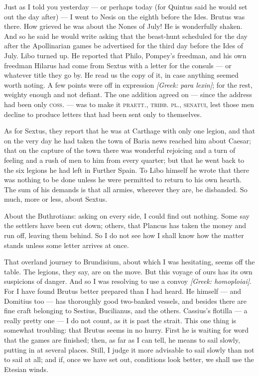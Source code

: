

 Just as I told you yesterday --- or perhaps today (for Quintus said he would set out the day after) --- I went to Nesis on the eighth before the Ides. Brutus was there. How grieved he was about the Nones of July! He is wonderfully shaken. And so he said he would write asking that the beast-hunt scheduled for the day after the Apollinarian games be advertised for the third day before the Ides of July. Libo turned up. He reported that Philo, Pompey's freedman, and his own freedman Hilarus had come from Sextus with a letter for the consuls --- or whatever title they go by. He read us the copy of it, in case anything seemed worth noting. A few points were off in expression \textit{[Greek: para lexin]}; for the rest, weighty enough and not defiant. The one addition agreed on --- since the address had been only \textsc{coss.} --- was to make it \textsc{praett., tribb. pl., senatui}, lest those men decline to produce letters that had been sent only to themselves.

 As for Sextus, they report that he was at Carthage with only one legion, and that on the very day he had taken the town of Baria news reached him about Caesar; that on the capture of the town there was wonderful rejoicing and a turn of feeling and a rush of men to him from every quarter; but that he went back to the six legions he had left in Further Spain. To Libo himself he wrote that there was nothing to be done unless he were permitted to return to his own hearth. The sum of his demands is that all armies, wherever they are, be disbanded. So much, more or less, about Sextus.

 About the Buthrotians: asking on every side, I could find out nothing. Some say the settlers have been cut down; others, that Plancus has taken the money and run off, leaving them behind. So I do not see how I shall know how the matter stands unless some letter arrives at once.

 That overland journey to Brundisium, about which I was hesitating, seems off the table. The legions, they say, are on the move. But this voyage of ours has its own suspicions of danger. And so I was resolving to use a convoy \textit{[Greek: homoploiai]}. For I have found Brutus better prepared than I had heard. He himself --- and Domitius too --- has thoroughly good two-banked vessels, and besides there are fine craft belonging to Sestius, Bucilianus, and the others. Cassius's flotilla --- a really pretty one --- I do not count, as it is past the strait. This one thing is somewhat troubling: that Brutus seems in no hurry. First he is waiting for word that the games are finished; then, as far as I can tell, he means to sail slowly, putting in at several places. Still, I judge it more advisable to sail slowly than not to sail at all; and if, once we have set out, conditions look better, we shall use the Etesian winds.
